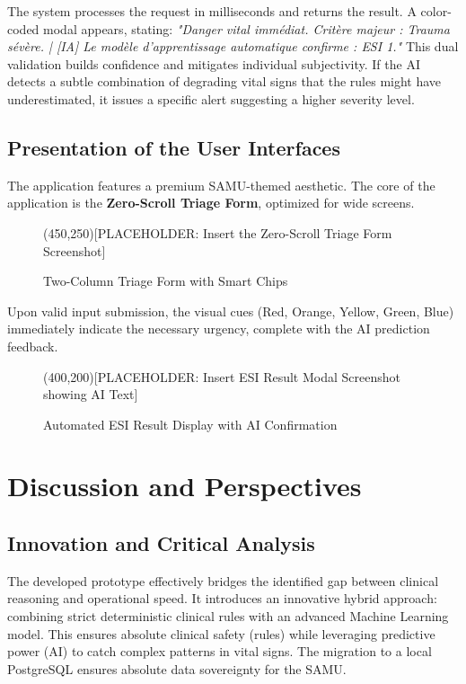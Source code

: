 \documentclass[a4paper,12pt,oneside]{report}
\begin{document}
The system processes the request in milliseconds and returns the result. A color-coded modal appears, stating: \textit{"Danger vital immédiat. Critère majeur : Trauma sévère. | [IA] Le modèle d'apprentissage automatique confirme : ESI 1."} This dual validation builds confidence and mitigates individual subjectivity. If the AI detects a subtle combination of degrading vital signs that the rules might have underestimated, it issues a specific alert suggesting a higher severity level.

\subsection{Presentation of the User Interfaces}
The application features a premium SAMU-themed aesthetic. The core of the application is the \textbf{Zero-Scroll Triage Form}, optimized for wide screens.

\begin{figure}[H]
\centering
\framebox(450,250){[PLACEHOLDER: Insert the Zero-Scroll Triage Form Screenshot]}
\caption{Two-Column Triage Form with Smart Chips}
\label{fig:ui_triage}
\end{figure}

Upon valid input submission, the visual cues (Red, Orange, Yellow, Green, Blue) immediately indicate the necessary urgency, complete with the AI prediction feedback.

\begin{figure}[H]
\centering
\framebox(400,200){[PLACEHOLDER: Insert ESI Result Modal Screenshot showing AI Text]}
\caption{Automated ESI Result Display with AI Confirmation}
\label{fig:ui_result}
\end{figure}

\section{Discussion and Perspectives}

\subsection{Innovation and Critical Analysis}
The developed prototype effectively bridges the identified gap between clinical reasoning and operational speed. It introduces an innovative hybrid approach: combining strict deterministic clinical rules with an advanced Machine Learning model. This ensures absolute clinical safety (rules) while leveraging predictive power (AI) to catch complex patterns in vital signs. The migration to a local PostgreSQL ensures absolute data sovereignty for the SAMU. 
\end{document}
